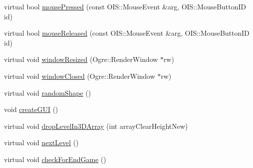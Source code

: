 \begin{DoxyCompactItemize}
\item 
virtual bool \hyperlink{class_base_application_a51b515984916eb7a1582499ee3309ac5}{mouse\-Pressed} (const O\-I\-S\-::\-Mouse\-Event \&arg, O\-I\-S\-::\-Mouse\-Button\-I\-D id)
\item 
virtual bool \hyperlink{class_base_application_ae347f583327e4ba1eb83f2df286c1d76}{mouse\-Released} (const O\-I\-S\-::\-Mouse\-Event \&arg, O\-I\-S\-::\-Mouse\-Button\-I\-D id)
\item 
virtual void \hyperlink{class_base_application_afe5d7ca9e0f0575b4046c1412e314e69}{window\-Resized} (Ogre\-::\-Render\-Window $\ast$rw)
\item 
virtual void \hyperlink{class_base_application_aa7130c376136aa3a9b121e2dee561aed}{window\-Closed} (Ogre\-::\-Render\-Window $\ast$rw)
\item 
virtual void \hyperlink{class_base_application_a0bc96be61b7f2cc41e3b7ac416900c91}{random\-Shape} ()
\item 
void \hyperlink{class_base_application_ae2e1a92373a8ca12dcc8a9d51bb0a4cb}{create\-G\-U\-I} ()
\item 
virtual void \hyperlink{class_base_application_a67bbbb14b9643246ce747ef27cc04c45}{drop\-Level\-In3\-D\-Array} (int array\-Clear\-Height\-New)
\item 
virtual void \hyperlink{class_base_application_a344f227b3fb9c4ed73823d4f6ec8e30c}{next\-Level} ()
\item 
virtual void \hyperlink{class_base_application_a0ca8072328f7b377d1df88b8173c42cd}{check\-For\-End\-Game} ()
\end{DoxyCompactItemize}
